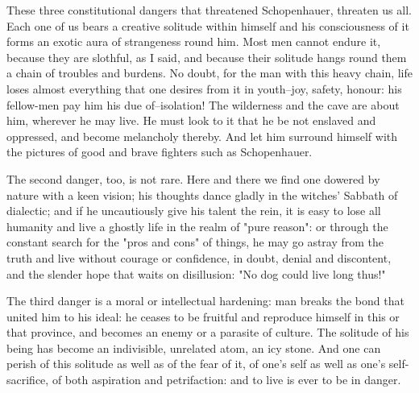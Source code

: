 These three constitutional dangers that threatened Schopenhauer,
threaten us all. Each one of us bears a creative solitude within
himself and his consciousness of it forms an exotic aura of
strangeness round him. Most men cannot endure it, because they are
slothful, as I said, and because their solitude hangs round them a
chain of troubles and burdens. No doubt, for the man with this heavy
chain, life loses almost everything that one desires from it in
youth--joy, safety, honour: his fellow-men pay him his due
of--isolation! The wilderness and the cave are about him, wherever he
may live. He must look to it that he be not enslaved and oppressed,
and become melancholy thereby. And let him surround himself with the
pictures of good and brave fighters such as Schopenhauer.

The second danger, too, is not rare. Here and there we find one
dowered by nature with a keen vision; his thoughts dance gladly in
the witches' Sabbath of dialectic; and if he uncautiously give his
talent the rein, it is easy to lose all humanity and live a ghostly
life in the realm of "pure reason": or through the constant search
for the "pros and cons" of things, he may go astray from the truth
and live without courage or confidence, in doubt, denial and
discontent, and the slender hope that waits on disillusion: "No dog
could live long thus!"

The third danger is a moral or intellectual hardening: man breaks the
bond that united him to his ideal: he ceases to be fruitful and
reproduce himself in this or that province, and becomes an enemy or a
parasite of culture. The solitude of his being has become an
indivisible, unrelated atom, an icy stone. And one can perish of this
solitude as well as of the fear of it, of one's self as well as one's
self-sacrifice, of both aspiration and petrifaction: and to live is
ever to be in danger.


